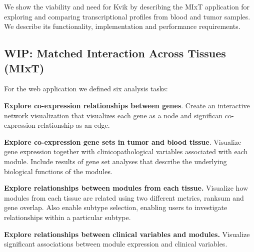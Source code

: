 %
%
We show the viability and need for Kvik by describing the MIxT application for
exploring and comparing transcriptional profiles from blood and tumor samples.
We describe its functionality, implementation 
and performance requirements.

\subsection*{WIP: Matched Interaction Across Tissues (MIxT)}

For the web application we defined six analysis tasks: 

\textbf{Explore co-expression relationships between genes}. Create an
interactive network visualization that visualizes each gene as a node and
significan co-expression relationship as an edge. 

\textbf{Explore co-expression gene sets in tumor and blood tissue}.
Visualize gene expression together with clinicopathological variables associated
with each module. Include results of gene set analyses that describe the
underlying biological functions of the modules. 

\textbf{Explore relationships between modules from each tissue.}
Visualize how modules from each tissue are related using two different
metrics, ranksum and gene overlap. Also enable subtype selection,
enabling users to investigate relationships within a particular subtype. 

\textbf{Explore relationships between clinical variables and modules.}
Visualize significant associations between module expression and
clinical variables.

